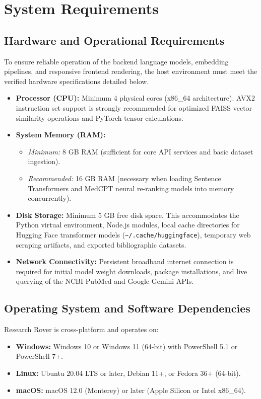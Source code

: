 \section{System Requirements}
\label{sec:requirements}

\subsection{Hardware and Operational Requirements}
To ensure reliable operation of the backend language models, embedding pipelines, and responsive frontend rendering, the host environment must meet the verified hardware specifications detailed below.

\begin{itemize}
    \item \textbf{Processor (CPU):} Minimum 4 physical cores (x86\_64 architecture). AVX2 instruction set support is strongly recommended for optimized FAISS vector similarity operations and PyTorch tensor calculations.
    \item \textbf{System Memory (RAM):}
    \begin{itemize}
        \item \textit{Minimum:} 8 GB RAM (sufficient for core API services and basic dataset ingestion).
        \item \textit{Recommended:} 16 GB RAM (necessary when loading Sentence Transformers and MedCPT neural re-ranking models into memory concurrently).
    \end{itemize}
    \item \textbf{Disk Storage:} Minimum 5 GB free disk space. This accommodates the Python virtual environment, Node.js modules, local cache directories for Hugging Face transformer models (\texttt{\textasciitilde/.cache/huggingface}), temporary web scraping artifacts, and exported bibliographic datasets.
    \item \textbf{Network Connectivity:} Persistent broadband internet connection is required for initial model weight downloads, package installations, and live querying of the NCBI PubMed and Google Gemini APIs.
\end{itemize}

\subsection{Operating System and Software Dependencies}
Research Rover is cross-platform and operates on:
\begin{itemize}
    \item \textbf{Windows:} Windows 10 or Windows 11 (64-bit) with PowerShell 5.1 or PowerShell 7+.
    \item \textbf{Linux:} Ubuntu 20.04 LTS or later, Debian 11+, or Fedora 36+ (64-bit).
    \item \textbf{macOS:} macOS 12.0 (Monterey) or later (Apple Silicon or Intel x86\_64).
\end{itemize}

